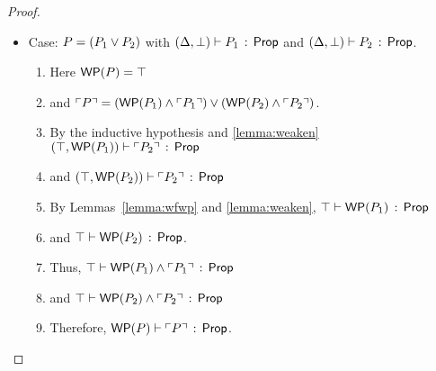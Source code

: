 \documentclass[10pt,letter]{article}
\begin{document}
\begin{proof}
\begin{itemize}
  \item Case: $P = (P_1 \vee P_2)$ with
       $(\Delta,\bot) \vdash P_1\, :\, \mathsf{Prop}$ and 
              $(\Delta,\bot) \vdash P_2\, :\, \mathsf{Prop}$.
      	\begin{enumerate}
		\item
                  Here $\mathop{\mathsf{WP}}(P) = \top$
                \item 
                  and $\ulcorner P \urcorner = 
                  (\mathop{\mathsf{WP}}(P_1) \wedge \ulcorner P_1 \urcorner) \vee (\mathop{\mathsf{WP}}(P_2) \wedge \ulcorner P_2 \urcorner)$.
		\item
                  By the inductive hypothesis and \ref{lemma:weaken}
                  $(\top,\mathop{\mathsf{WP}}(P_1)) \vdash \ulcorner P_2 \urcorner\, :\, \mathsf{Prop}$ 
                \item
                  and
                  $(\top,\mathop{\mathsf{WP}}(P_2)) \vdash \ulcorner P_2 \urcorner\, :\, \mathsf{Prop}$ 
		\item
                  By Lemmas~\ref{lemma:wfwp} and \ref{lemma:weaken},
                  $\top \vdash \mathop{\mathsf{WP}}(P_1)\, :\, \mathsf{Prop}$
                \item
                  and
                  $\top \vdash \mathop{\mathsf{WP}}(P_2)\, :\, \mathsf{Prop}$.
		\item
                  Thus, 
                  $\top \vdash \mathop{\mathsf{WP}}(P_1) \wedge \ulcorner P_1 \urcorner\, :\, \mathsf{Prop}$
                \item
                  and 
                  $\top \vdash \mathop{\mathsf{WP}}(P_2) \wedge \ulcorner P_2 \urcorner\, :\, \mathsf{Prop}$
		\item
                  Therefore,
                  $\mathop{\mathsf{WP}}(P) \vdash \ulcorner P \urcorner\, :\, \mathsf{Prop}$.
		\end{enumerate}    
      

\end{itemize}
\end{proof}
\end{document}
